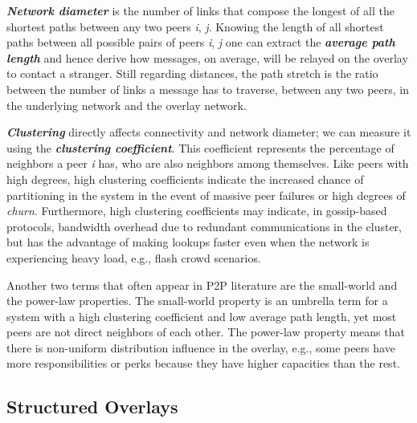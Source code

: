 \documentclass[runningheads]{llncs}
\begin{document}
\textbf{\textit{Network diameter}} is the number of links that compose the longest of all the shortest paths between any two peers \textit{i}, \textit{j}. Knowing the length of all shortest paths between all possible pairs of peers \textit{i}, \textit{j} one can extract the \textbf{\textit{average path length}} and hence derive how messages, on average, will be relayed on the overlay to contact a stranger. Still regarding distances, the path stretch is the ratio between the number of links a message has to traverse, between any two peers, in the underlying network and the overlay network.

\textbf{\textit{Clustering}} directly affects connectivity and network diameter; we can measure it using the \textbf{\textit{clustering coefficient}}. This coefficient represents the percentage of neighbors a peer \textit{i} has, who are also neighbors among themselves. Like peers with high degrees, high clustering coefficients indicate the increased chance of partitioning in the system in the event of massive peer failures or high degrees of \textit{churn}. Furthermore, high clustering coefficients may indicate, in gossip-based protocols, bandwidth overhead due to redundant communications in the cluster, but has the advantage of making lookups faster even when the network is experiencing heavy load, e.g., flash crowd scenarios.

Another two terms that often appear in P2P literature are the small-world and the power-law properties. The small-world property is an umbrella term for a system with a high clustering coefficient and low average path length, yet most peers are not direct neighbors of each other. The power-law property means that there is non-uniform distribution influence in the overlay, e.g., some peers have more responsibilities or perks because they have higher capacities than the rest.

\subsection{Structured Overlays}
\end{document}
